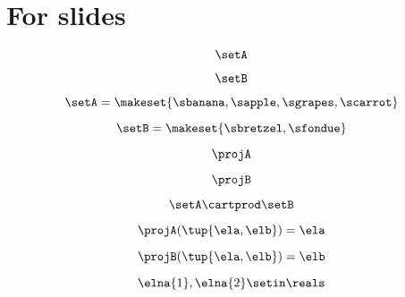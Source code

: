
\section[For slides]{For slides}

\begin{forslides}

    \begin{equation}
        \label{eq:systems-000}
        \setA
    \end{equation}

    \begin{equation}
        \label{eq:systems-001}
        \setB
    \end{equation}

    \begin{equation}
        \label{eq:systems-002}
        \setA = \makeset{\sbanana, \sapple, \sgrapes, \scarrot}
    \end{equation}

    \begin{equation}
        \label{eq:systems-003}
        \setB = \makeset{ \sbretzel, \sfondue }
    \end{equation}

    \begin{equation}
        \label{eq:systems-004}
        \projA
    \end{equation}

    \begin{equation}
        \label{eq:systems-005}
        \projB
    \end{equation}

    \begin{equation}
        \label{eq:systems-006}
        \setA \cartprod \setB
    \end{equation}

    \begin{equation}
        \label{eq:systems-007}
        \projA(\tup{\ela,\elb}) =  \ela
    \end{equation}

    \begin{equation}
        \label{eq:systems-008}
        \projB(\tup{\ela,\elb}) = \elb
    \end{equation}

    \begin{equation}
        \label{eq:systems-009}
        \elna{1},\elna{2}\setin \reals
    \end{equation}


\end{forslides}
